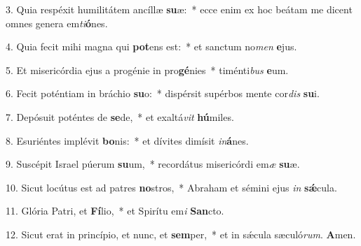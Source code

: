 \item 3. Quia respéxit humilitátem ancíllæ \textbf{su}æ:~* ecce enim ex hoc beátam me dicent omnes genera em\textit{ti}\textbf{ó}nes.

\item 4. Quia fecit mihi magna qui \textbf{pot}ens est:~* et sanctum no\textit{men} \textbf{e}jus.

\item 5. Et misericórdia ejus a progénie in pro\textbf{gé}nies~* timénti\textit{bus} \textbf{e}um.

\item 6. Fecit poténtiam in bráchio \textbf{su}o:~* dispérsit supérbos mente cor\textit{dis} \textbf{su}i.

\item 7. Depósuit poténtes de \textbf{se}de,~* et exaltá\textit{vit} \textbf{hú}miles.

\item 8. Esuriéntes implévit \textbf{bo}nis:~* et dívites dimísit \textit{in}\textbf{á}nes.

\item 9. Suscépit Israel púerum \textbf{su}um,~* recordátus misericórdi em\textit{æ} \textbf{su}æ.

\item 10. Sicut locútus est ad patres \textbf{no}stros,~* Abraham et sémini ejus \textit{in} \textbf{sǽ}cula.

\item 11. Glória Patri, et \textbf{Fí}lio,~* et Spirítu em\textit{i} \textbf{San}cto.

\item 12. Sicut erat in princípio, et nunc, et \textbf{sem}per,~* et in sǽcula sæculó\textit{rum}. \textbf{A}men.